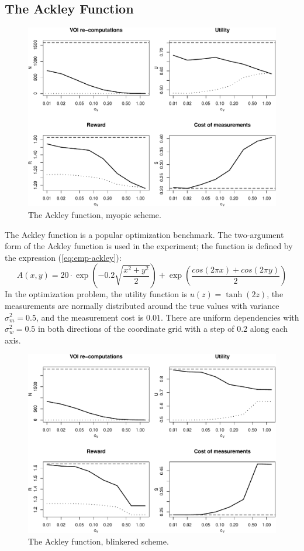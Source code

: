 \subsection{The Ackley Function}

\begin{figure}[t]
\centering
\includegraphics[scale=0.63]{ackley-myopic.pdf}
\caption{The Ackley function, myopic scheme.}
\label{fig:ackley-myopic}
\end{figure}
The Ackley function \cite{Ackley.function} is a popular optimization
benchmark. The two-argument form of the Ackley function is used in the
experiment; the function is defined by the expression (\ref{eq:emp-ackley}):
\begin{equation}
\label{eq:emp-ackley}
A(x,y)=20\cdot \exp\left(-0.2\sqrt { \frac {x^2+y^2} 2}\right)+\exp\left(\frac{cos(2\pi x)+cos(2\pi y)} 2\right)
\end{equation}
In the optimization problem, the utility function is
$u(z)=\tanh(2z)$, the measurements are normally distributed around the
true values with variance $\sigma_m^2=0.5$, and the measurement cost is
$0.01$. There are uniform dependencies with $\sigma_w^2=0.5$ in both
directions of the coordinate grid with a step of $0.2$ along each axis.
\begin{figure}[t]
\centering
\includegraphics[scale=0.63]{ackley-blinkered.pdf}
\caption{The Ackley function, blinkered scheme.}
\label{fig:ackley-blinkered}
\end{figure}
